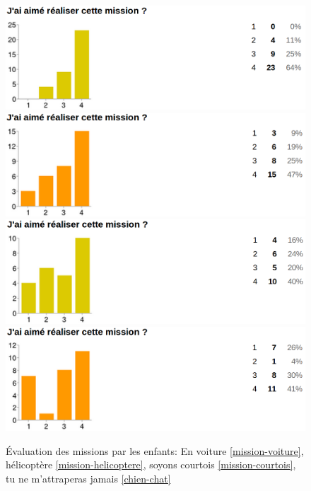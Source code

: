 \begin{figure}[ht]
  \begin{center}
    \includegraphics[width=\textwidth]{content/8-validation/images/voiture}
    \includegraphics[width=\textwidth]{content/8-validation/images/helico}
    \includegraphics[width=\textwidth]{content/8-validation/images/courtois}
    \includegraphics[width=\textwidth]{content/8-validation/images/chien}
    \caption{Évaluation des missions par les enfants: En voiture \ref{mission-voiture}, hélicoptère \ref{mission-helicoptere}, soyons courtois \ref{mission-courtois}, tu ne m'attraperas jamais \ref{chien-chat}}
    \label{fig:evaluation-mission}
  \end{center}
\end{figure}

